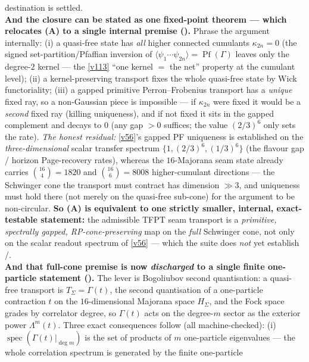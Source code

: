 \documentclass[11pt,a4paper]{article}
\begin{document}
\begin{keybox}
destination is settled.
\smallskip\\
\noindent\textbf{And the closure can be stated as one fixed-point theorem --- which relocates (A) to a
single internal premise ().} Phrase the argument internally:
(i) a quasi-free state has \emph{all} higher connected cumulants $\kappa_{2n}{=}0$ (the signed
set-partition/Pfaffian inversion of $\langle\psi_1\cdots\psi_{2n}\rangle=\operatorname{Pf}(\Gamma)$ leaves
only the degree-$2$ kernel --- the \vref{v113} ``one kernel $=$ the net'' property at the cumulant level);
(ii) a kernel-preserving transport fixes the whole quasi-free state by Wick functoriality; (iii) a gapped
primitive Perron--Frobenius transport has a \emph{unique} fixed ray, so a non-Gaussian piece is impossible
--- if $\kappa_{2n}$ were fixed it would be a \emph{second} fixed ray (killing uniqueness), and if not
fixed it sits in the gapped complement and decays to $0$ (any gap $>0$ suffices; the value $(2/3)^6$ only
sets the rate). \emph{The honest residual:} \vref{v56}'s gapped PF uniqueness is established on the
\emph{three-dimensional} scalar transfer spectrum $\{1,(2/3)^6,(1/3)^6\}$ (the flavour gap / horizon
Page-recovery rates), whereas the $16$-Majorana seam state already carries $\binom{16}{4}{=}1820$ and
$\binom{16}{6}{=}8008$ higher-cumulant directions --- the Schwinger cone the transport must contract has
dimension $\gg3$, and uniqueness must hold there (not merely on the quasi-free sub-cone) for the argument
to be non-circular. \textbf{So (A) is equivalent to one strictly smaller, internal, exact-testable
statement:} the admissible TFPT seam transport is a \emph{primitive, spectrally gapped, RP-cone-preserving}
map on the \emph{full} Schwinger cone, not only on the scalar readout spectrum of \vref{v56} --- which the
suite does \emph{not} yet establish \mE/\mO.
\smallskip\\
\noindent\textbf{And that full-cone premise is now \emph{discharged} to a single finite one-particle
statement ().} The lever is Bogoliubov second quantisation: a
quasi-free transport is $T_\Sigma=\Gamma(t)$, the second quantisation of a one-particle contraction $t$ on
the $16$-dimensional Majorana space $H_\Sigma$, and the Fock space grades by correlator degree, so
$\Gamma(t)$ acts on the degree-$m$ sector as the exterior power $\Lambda^m(t)$. Three exact consequences
follow (all machine-checked): (i) $\operatorname{spec}(\Gamma(t)|_{\deg m})$ is the set of products of $m$
one-particle eigenvalues --- the whole correlation spectrum is generated by the finite one-particle

\end{keybox}
\end{document}
